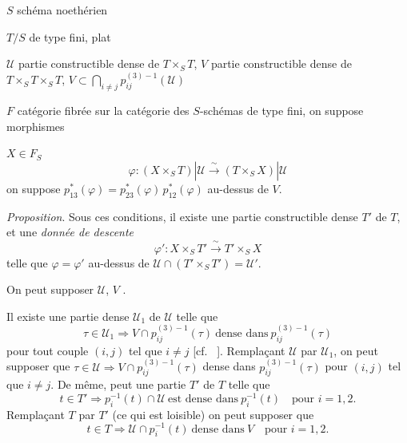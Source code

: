 \documentclass[11pt,a4paper]{article}
\begin{document}

$S$ schéma noethérien

$T/S$ de type fini, \struck{\ill{}} plat

$\mathcal{U}$ partie constructible dense de $T \times_S T$,
$V$ partie constructible dense de $T \times_S T \times_S T$,
$V \subset \bigcap_{i \neq j} p^{(3)-1}_{ij}(\mathcal{U})$

$F$ catégorie fibrée sur la catégorie des $S$-schémas de type fini, on
suppose   \struck{\ill{}} \add{\ill{}} morphismes 
 \ill{} \ill{} \ill{} \ill{} 
\struck{\ill{}}

$X \in F_S$
\[
\varphi \colon (X \times_S T)|\mathcal{U} \xrightarrow{\ \sim\ }
(T \times_S X)|\mathcal{U}
\]
on suppose $p_{13}^{*}(\varphi) = p_{23}^{*}(\varphi)\, p_{12}^{*}(\varphi)$
au-dessus de $V$.

\emph{Proposition}. Sous ces conditions, il existe une partie
constructible dense $T'$ de $T$,  et une
\emph{donnée de descente}
\[
\varphi' \colon X \times_S T' \xrightarrow{\ \sim\ } T' \times_S X
\]
telle que $\varphi = \varphi'$  au-dessus de
$\mathcal{U} \cap (T' \times_S T') = \mathcal{U}'$.

On peut supposer $\mathcal{U}$, $V$  \ill{}
\emph{   }.

Il existe une partie  dense $\mathcal{U}_1$ de
$\mathcal{U}$ telle que
\[
\tau \in \mathcal{U}_1 \Rightarrow V \cap p^{(3)-1}_{ij}(\tau)
\ \text{dense dans}\ p^{(3)-1}_{ij}(\tau)
\]
pour tout couple $(i,j)$ tel que $i \neq j$ [cf.\ \ill{} \ill{} \ill{}
\ill{}  ]. Remplaçant $\mathcal{U}$ par $\mathcal{U}_1$, on
peut  supposer que
$\tau \in \mathcal{U} \Rightarrow V \cap p^{(3)-1}_{ij}(\tau)$
dense dans $p^{(3)-1}_{ij}(\tau)$ pour $(i,j)$ tel que
$i \neq j$. De même,  peut  une partie
 $T'$ de $T$ telle que
\[
t \in T' \Rightarrow p_i^{-1}(t) \cap \mathcal{U}
\ \text{est dense dans}\ p_i^{-1}(t) \quad \text{pour } i = 1, 2 .
\]
Remplaçant $T$ par $T'$ (ce qui est loisible) on peut
supposer que
\[
t \in T \Rightarrow \mathcal{U} \cap p_i^{-1}(t) \ \text{dense dans}\ V
\quad \text{pour } i = 1, 2 .
\]
\end{document}
